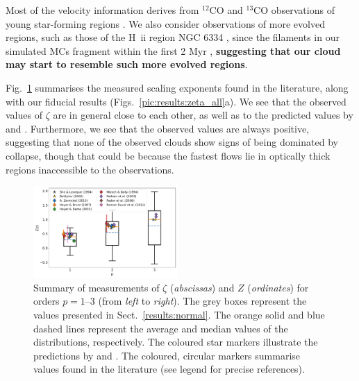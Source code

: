 

Most of the velocity information derives from $^{12}$CO and $^{13}$CO observations of young star-forming regions \citep[e.g., Perseus and Taurus][]{Padoan2003}.
We also consider observations of more evolved regions, such as those of the H~{\sc ii} region NGC 6334 \citep{Zernickel2015}, since the filaments in our simulated MCs fragment within the first 2 Myr , \textbf{suggesting that our cloud may start to resemble such more evolved regions}.

Fig.~\ref{pic:discussion:comp_observation} summarises the measured scaling exponents found in the literature, along with our fiducial results (Figs.~\ref{pic:results:zeta_all}a).
We see that the observed values of $\zeta$ are in general close to each other, as well as to the predicted values by \citet{She1994} and \citet{Boldyrev2002}. 
Furthermore, we see that the observed values are always positive, suggesting that none of the observed clouds show signs of being dominated by collapse, though that could be because the fastest flows lie in optically thick regions inaccessible to the observations.  

\begin{figure}
	\includegraphics[width=0.49\textwidth]{compare_observations.pdf}
	\caption{Summary of measurements of $\zeta$ (\textit{abscissas}) and $Z$ (\textit{ordinates}) for orders $p=1$--3 (from \textit{left} to \textit{right}). The grey boxes represent the values presented in Sect.~\ref{results:normal}. The orange solid and blue dashed lines represent the average and median values of the distributions, respectively. The coloured star markers illustrate the predictions by \citet{She1994} and \citet{Boldyrev2002}. The coloured, circular markers summarise values found in the literature (see legend for precise references).
	}
	\label{pic:discussion:comp_observation}
\end{figure}


